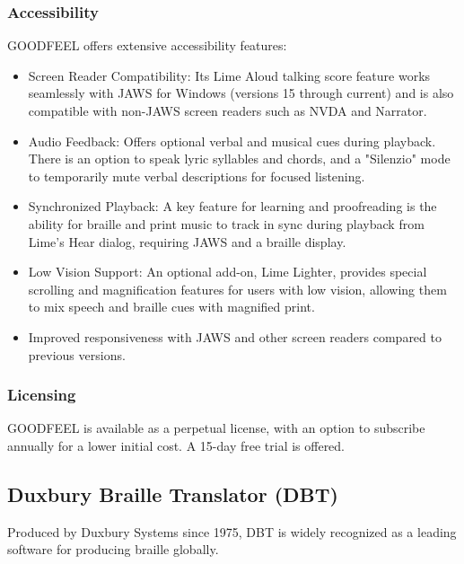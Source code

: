 \subsubsection{Accessibility}
GOODFEEL offers extensive accessibility features:
\begin{itemize}
    \item Screen Reader Compatibility: Its Lime Aloud talking score feature works seamlessly with JAWS for Windows (versions 15 through current) and is also compatible with non-JAWS screen readers such as NVDA and Narrator. \cite{dancingdots-goodfeel, canasstech-limealoud}
    \item Audio Feedback: Offers optional verbal and musical cues during playback. \cite{dancingdots-goodfeel} There is an option to speak lyric syllables and chords, and a "Silenzio" mode to temporarily mute verbal descriptions for focused listening. \cite{dancingdots-goodfeel}
    \item Synchronized Playback: A key feature for learning and proofreading is the ability for braille and print music to track in sync during playback from Lime's Hear dialog, requiring JAWS and a braille display. \cite{dancingdots-goodfeel}
    \item Low Vision Support: An optional add-on, Lime Lighter, provides special scrolling and magnification features for users with low vision, allowing them to mix speech and braille cues with magnified print. \cite{dancingdots-goodfeel, dancingdots-products}
    \item Improved responsiveness with JAWS and other screen readers compared to previous versions. \cite{dancingdots-goodfeel}
\end{itemize}

\subsubsection{Licensing}
GOODFEEL is available as a perpetual license, with an option to subscribe annually for a lower initial cost. \cite{dancingdots-goodfeel} A 15-day free trial is offered. \cite{dancingdots-goodfeel}

\subsection{Duxbury Braille Translator (DBT)}
Produced by Duxbury Systems since 1975, DBT is widely recognized as a leading software for producing braille globally. \cite{duxbury-dbt, duxbury-brochure, duxbury-main}

